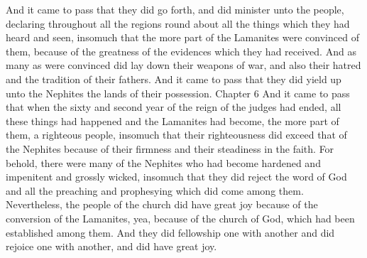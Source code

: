 And it came to pass that they did go forth, and did minister unto the people, declaring throughout all the regions round about all the things which they had heard and seen, insomuch that the more part of the Lamanites were convinced of them, because of the greatness of the evidences which they had received.
\bverse \iffalse And as many as were convinced did lay down their weapons of war, and also their hatred and the tradition of their fathers. \fi
And as many as were convinced did lay down their weapons of war, and also their hatred and the tradition of their fathers.
\bverse \iffalse And it came to pass that they did yield up unto the Nephites the lands of their possession. \fi
And it came to pass that they did yield up unto the Nephites the lands of their possession.
Chapter 6
\bchapter
\bverse \iffalse And it came to pass that when the sixty and second year of the reign of the judges had ended, all these things had happened and the Lamanites had become, the more part of them, a righteous people, insomuch that their righteousness did exceed that of the Nephites because of their firmness and their steadiness in the faith. \fi
And it came to pass that when the sixty and second year of the reign of the judges had ended, all these things had happened and the Lamanites had become, the more part of them, a righteous people, insomuch that their righteousness did exceed that of the Nephites because of their firmness and their steadiness in the faith.
\bverse \iffalse For behold, there were many of the Nephites who had become hardened and impenitent and grossly wicked, insomuch that they did reject the word of God and all the preaching and prophesying which did come among them. \fi
For behold, there were many of the Nephites who had become hardened and impenitent and grossly wicked, insomuch that they did reject the word of God and all the preaching and prophesying which did come among them.
\bverse \iffalse Nevertheless, the people of the church did have great joy because of the conversion of the Lamanites, yea, because of the church of God, which had been established among them. And they did fellowship one with another and did rejoice one with another, and did have great joy. \fi
Nevertheless, the people of the church did have great joy because of the conversion of the Lamanites, yea, because of the church of God, which had been established among them. And they did fellowship one with another and did rejoice one with another, and did have great joy.
\bverse \iffalse And it came to pass that many of the Lamanites did come down into the land of Zarahemla, and did declare unto the people of the Nephites the manner of their conversion, and did exhort them to faith and repentance. \fi
